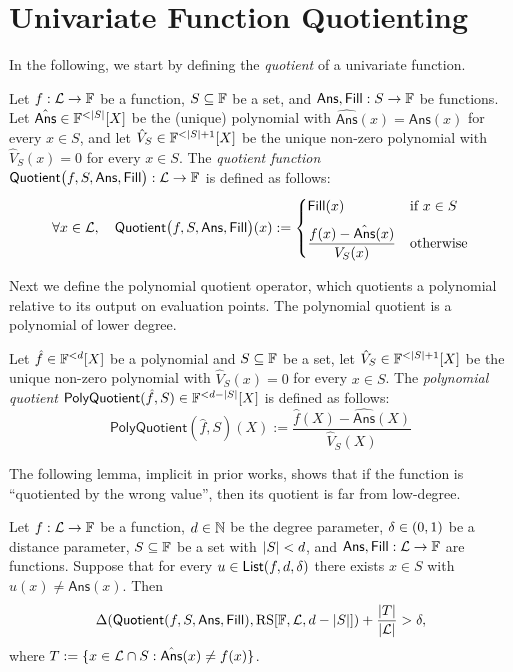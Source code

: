 \section{Univariate Function Quotienting}\label{sec:quotienting}

In the following, we start by defining the \emph{quotient} of a univariate function.
\begin{definition}\label{def:quotient}
    Let $f:\mathcal{L}\to\mathbb{F}$ be a function, $S\subseteq\mathbb{F}$ be a set, and $\mathsf{Ans},\mathsf{Fill}: S\rightarrow\mathbb{F}$ be functions. Let $\hat{\mathsf{Ans}}\in\field^{<|S|}[X]$ be the (unique) polynomial with $\hat{\mathsf{Ans}}(x)=\mathsf{Ans}(x)$ for every $x\in S$, and let $\hat{V}_S\in\field^{<|S|+1}[X]$ be the unique non-zero polynomial with $\hat{V}_S(x)=0$ for every $x\in S$.
    The \emph{quotient function} $\mathsf{Quotient}\bigl(f,S,\mathsf{Ans},\mathsf{Fill}\bigr): \mathcal{L}\to\mathbb{F}$
    is defined as follows:
\[
\forall x \in \mathcal{L},\quad
\mathsf{Quotient}\bigl(f,S,\mathsf{Ans},\mathsf{Fill}\bigr)(x)
:=
\begin{cases}
\mathsf{Fill}(x)
& \text{if } x \in S \\[6pt]
\dfrac{f(x) - \hat{\mathsf{Ans}}(x)}{V_S(x)}
& \text{otherwise}
\end{cases}
\]
\end{definition}

Next we define the polynomial quotient operator, which quotients a polynomial relative to its output on evaluation points. The polynomial quotient is a polynomial of lower degree.

\begin{definition}\label{def:poly_quotient}
    Let $\hat{f}\in\mathbb{F}^{<d}[X]$ be a polynomial and $S\subseteq\mathbb{F}$ be a set, let $\hat{V}_S\in\field^{<|S|+1}[X]$ be the unique non-zero polynomial with $\hat{V}_S(x)=0$ for every $x\in S$. The \emph{polynomial quotient} $\mathsf{PolyQuotient}(\hat{f},S)\in\mathbb{F}^{<d-|S|}[X]$ is defined as follows:
    \[
            \mathsf{PolyQuotient}(\hat{f},S)(X):=\frac{\hat{f}(X)-\hat{\mathsf{Ans}}(X)}{\hat{V}_S(X)}
    \]

\end{definition}

The following lemma, implicit in prior works, shows that if the function is ``quotiented by the wrong value'', then its quotient is far from low-degree.

\begin{lemma}\label{lemma:quotienting}
{}
    Let $f:\mathcal{L}\rightarrow\mathbb{F}$ be a function, $d\in\mathbb{N}$ be the degree parameter, $\delta\in(0,1)$
    be a distance parameter, $S\subseteq\mathbb{F}$ be a set with $|S|<d$, and $\mathsf{Ans},\mathsf{Fill}:\mathcal{L}\rightarrow\mathbb{F}$ are functions. Suppose that for every $u\in\mathsf{List}(f,d,\delta)$ there exists $x\in S$ with $\hat{u}(x)\neq\mathsf{Ans}(x)$. Then 
    \[
            \Delta(\mathsf{Quotient}(f,S,\mathsf{Ans},\mathsf{Fill}),\mathrm{RS}[\mathbb{F},\mathcal{L},d-|S|])+\frac{|T|}{|\mathcal{L}|}>\delta,
    \]
    where $T:=\{x\in\mathcal{L}\cap S: \hat{\mathsf{Ans}}(x)\neq f(x)\}$.
\end{lemma}


